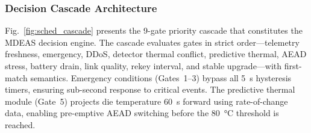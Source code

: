 \subsubsection{Decision Cascade Architecture}
Fig.~\ref{fig:sched_cascade} presents the 9-gate priority cascade
that constitutes the MDEAS decision engine.  The cascade evaluates
gates in strict order---telemetry freshness, emergency, DDoS, detector
thermal conflict, predictive thermal, AEAD stress, battery drain, link
quality, rekey interval, and stable upgrade---with first-match semantics.
Emergency conditions (Gates~1--3) bypass all \SI{5}{\second} hysteresis
timers, ensuring sub-second response to critical events.  The
predictive thermal module (Gate~5) projects die temperature
\SI{60}{\second} forward using rate-of-change data, enabling
pre-emptive AEAD switching before the \SI{80}{\degreeCelsius} threshold
is reached.

